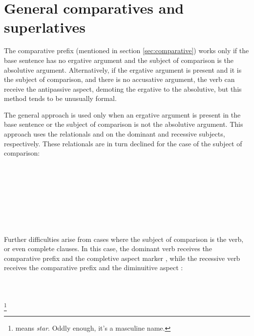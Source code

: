 \documentclass{book}
\begin{document}
\section{General comparatives and superlatives}

The comparative prefix  (mentioned in section \ref{sec:comparative}) works only if the base sentence has no ergative argument and the subject of comparison is the absolutive argument. Alternatively, if the ergative argument is present and it is the subject of comparison, and there is no accusative argument, the verb can receive the antipassive aspect, demoting the ergative to the absolutive, but this method tends to be unusually formal.

The general approach is used only when an ergative argument is present in the base sentence or the subject of comparison is not the absolutive argument. This approach uses the relationals  and  on the dominant and recessive subjects, respectively. These relationals are in turn declined for the case of the subject of comparison: \\
~\\
    \\
    \\
    \\
~\\
    \\
    \\
     \\

Further difficulties arise from cases where the subject of comparison is the verb, or even complete clauses. In this case, the dominant verb receives the comparative prefix  and the completive aspect marker , while the recessive verb receives the comparative prefix and the diminuitive aspect : \\
~\\
     \\
     \\
     \footnote{ means \emph{star}. Oddly enough, it's a masculine name.} \\
\end{document}
